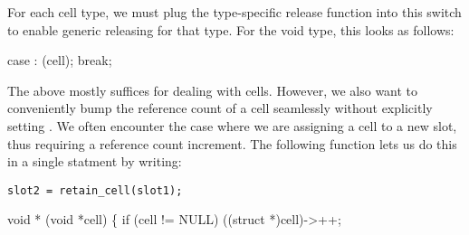\documentclass{article}%
\begin{document}
For each cell type, we must plug the type-specific release function
into this {\Tt{}\nwendquote} switch to enable generic releasing
for that type.
For the {\Tt{}void\nwendquote} type, this looks as follows:

\nwenddocs{}\endmoddef\nwstartdeflinemarkup{}\nwenddeflinemarkup
case :
        (cell);
        break;
\nwendcode{}\nwdocspar

The above mostly suffices for dealing with cells.
However, we also want to conveniently bump
the reference count of a cell seamlessly
without explicitly setting {\Tt{}\nwendquote}.
We often encounter the case where we are assigning a cell
to a new slot,
thus requiring a reference count increment.
The following function {\Tt{}\nwendquote} lets us do this
in a single statment by writing:

\begin{verbatim}
slot2 = retain_cell(slot1);
\end{verbatim}

\nwenddocs{}\plusendmoddef\nwstartdeflinemarkup{}\nwenddeflinemarkup
{} void *
(void *cell)
\{
        if (cell != NULL)
                ((struct  *)cell)->++;
\end{document}
